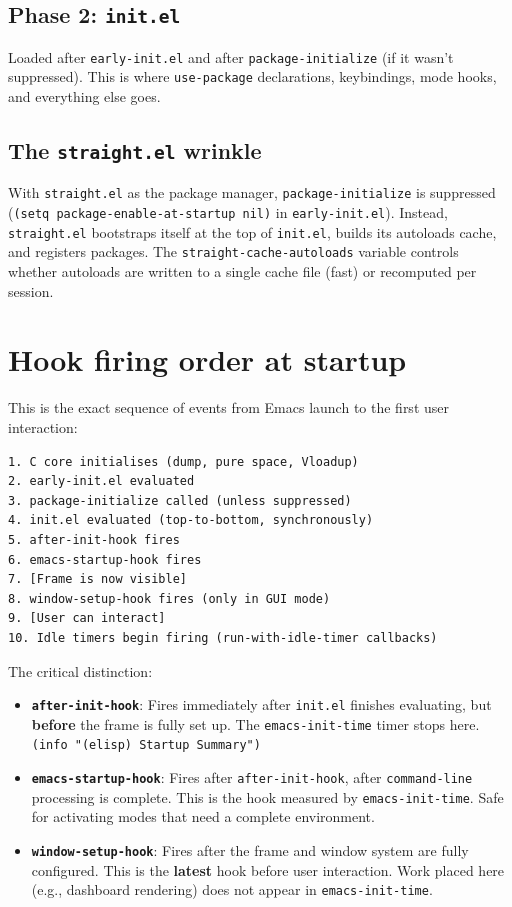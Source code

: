 \subsection{Phase 2: \texttt{init.el}}\label{phase-2-init.el}

Loaded after \texttt{early-init.el} and after \texttt{package-initialize} (if it wasn't suppressed). This is where \texttt{use-package} declarations, keybindings, mode hooks, and everything else goes.

\subsection{The \texttt{straight.el} wrinkle}\label{the-straight.el-wrinkle}

With \texttt{straight.el} as the package manager, \texttt{package-initialize} is suppressed (\texttt{(setq package-enable-at-startup nil)} in \texttt{early-init.el}). Instead, \texttt{straight.el} bootstraps itself at the top of \texttt{init.el}, builds its autoloads cache, and registers packages. The \texttt{straight-cache-autoloads} variable controls whether autoloads are written to a single cache file (fast) or recomputed per session.

\section{Hook firing order at startup}\label{hook-firing-order-at-startup}

This is the exact sequence of events from Emacs launch to the first user interaction:

\begin{verbatim}
1. C core initialises (dump, pure space, Vloadup)
2. early-init.el evaluated
3. package-initialize called (unless suppressed)
4. init.el evaluated (top-to-bottom, synchronously)
5. after-init-hook fires
6. emacs-startup-hook fires
7. [Frame is now visible]
8. window-setup-hook fires (only in GUI mode)
9. [User can interact]
10. Idle timers begin firing (run-with-idle-timer callbacks)
\end{verbatim}

The critical distinction:

\begin{itemize}
\item \textbf{\texttt{after-init-hook}}: Fires immediately after \texttt{init.el} finishes evaluating, but \textbf{before} the frame is fully set up. The \texttt{emacs-init-time} timer stops here. \texttt{(info "(elisp) Startup Summary")}
\item \textbf{\texttt{emacs-startup-hook}}: Fires after \texttt{after-init-hook}, after \texttt{command-line} processing is complete. This is the hook measured by \texttt{emacs-init-time}. Safe for activating modes that need a complete environment.
\item \textbf{\texttt{window-setup-hook}}: Fires after the frame and window system are fully configured. This is the \textbf{latest} hook before user interaction. Work placed here (e.g., dashboard rendering) does not appear in \texttt{emacs-init-time}.
\end{itemize}

